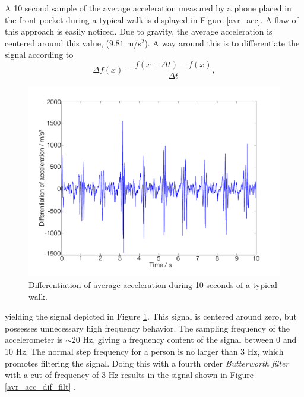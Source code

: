 \documentclass{LTHthesis}
\begin{document}
A 10 second sample of the average acceleration measured by a phone placed in the front pocket during a typical walk is displayed in Figure \ref{avr_acc}. A flaw of this approach is easily noticed. Due to gravity, the average acceleration is centered around this value, ($9.81$ m/s$^2$). A way around this is to differentiate the signal according to 
%
\begin{equation}
\Delta f(x) = \frac{f(x+\Delta t) - f(x) }{\Delta t},
\end{equation} 
%
\begin{figure}[!hbt]

\includegraphics[width=1\textwidth ]{images/kinematic/avr_acc_dif}
\caption{Differentiation of average acceleration during 10 seconds of a typical walk.}\label{avr_acc_dif}
\end{figure}
%
yielding the signal depicted in Figure \ref{avr_acc_dif}. This signal is centered around zero, but possesses unnecessary high frequency behavior. The sampling frequency of the accelerometer is $\sim 20$ Hz, giving a frequency content of the signal between 0 and 10 Hz. The normal step frequency for a person is no larger than 3 Hz, which promotes filtering the signal. Doing this with a fourth order \emph{Butterworth filter} with a cut-of frequency of 3 Hz results in the signal shown in Figure \ref{avr_acc_dif_filt} \cite{pro07}.
%
\end{document}
